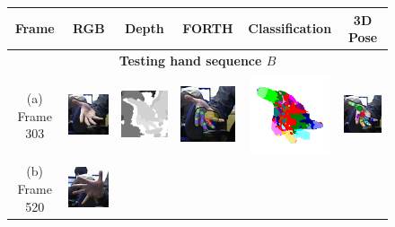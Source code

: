 \begin{figure}
	\centering
	\begin{tabular}{@{}cc@{}c@{}c@{}c@{}c@{}}
		\textbf{Frame} & \textbf{RGB} & \textbf{Depth} & \textbf{FORTH} & \textbf{Classification} & \textbf{3D Pose} \\ 
		\hline 
		\multicolumn{6}{c}{\textbf{Testing hand sequence $B$}} \\ 
		\hline 
		\raisebox{1.3cm}{\parbox{2cm}{\centering (a)\\Frame 303}} & 
		\includegraphics[width=2.35cm]{fig/hand/qual/rgb/image_0303.png} &
		\includegraphics[width=2.35cm]{fig/hand/qual/depth/image_0303.png} &
		\includegraphics[width=2.35cm]{fig/hand/qual/forth/image_0303.png} &
		\includegraphics[width=2.35cm]{fig/hand/qual/class/class-303.png} &
		\includegraphics[width=2.35cm]{fig/hand/qual/vote/image_0303.png}
		\label{fig/hand/multi1} \\
		\raisebox{1cm}{\parbox{2cm}{\centering (b)\\Frame 520}} & 
		\includegraphics[width=2.35cm]{fig/hand/qual/rgb/image_0520.png} &

\end{tabular}
\end{figure}
